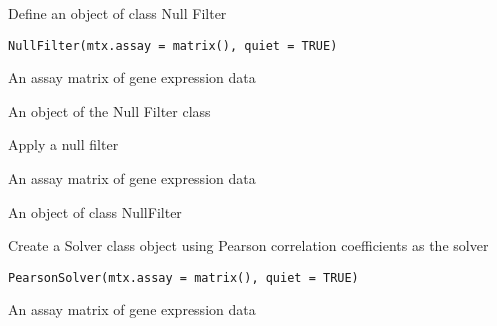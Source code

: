 \documentclass[a4paper]{book}
\begin{document}
%
\begin{Description}\relax
Define an object of class Null Filter
\end{Description}
%
\begin{Usage}
\begin{verbatim}
NullFilter(mtx.assay = matrix(), quiet = TRUE)
\end{verbatim}
\end{Usage}
%
\begin{Arguments}
\begin{ldescription}
\item[\code{mtx.assay}] An assay matrix of gene expression data
\end{ldescription}
\end{Arguments}
%
\begin{Value}
An object of the Null Filter class
\end{Value}
%
\begin{Description}\relax
Apply a null filter
\end{Description}
%
\begin{Arguments}
\begin{ldescription}
\item[\code{mtx.assay}] An assay matrix of gene expression data
\end{ldescription}
\end{Arguments}
%
\begin{Value}
An object of class NullFilter
\end{Value}
%
\begin{Description}\relax
Create a Solver class object using  Pearson correlation coefficients as the solver
\end{Description}
%
\begin{Usage}
\begin{verbatim}
PearsonSolver(mtx.assay = matrix(), quiet = TRUE)
\end{verbatim}
\end{Usage}
%
\begin{Arguments}
\begin{ldescription}
\item[\code{mtx.assay}] An assay matrix of gene expression data
\end{ldescription}
\end{Arguments}
\end{document}
